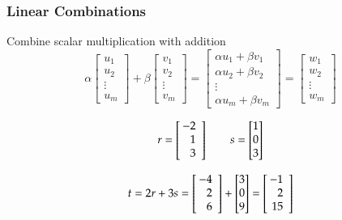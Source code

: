 \documentclass[10pt]{beamer}
\begin{document}
\begin{frame}
\frametitle{Linear Combinations}

Combine scalar multiplication with addition
\begin{equation*}
      \alpha \begin{bmatrix} u_1 \\ u_2 \\ \vdots \\ u_m\end{bmatrix}
    + \beta  \begin{bmatrix} v_1 \\ v_2 \\ \vdots \\ v_m\end{bmatrix}
    = \begin{bmatrix}\alpha u_1 + \beta v_1\\
                     \alpha u_2 + \beta v_2\\
                     \vdots \\
                     \alpha u_m + \beta v_m  \end{bmatrix}
    = \begin{bmatrix} w_1 \\ w_2 \\ \vdots \\ w_m \end{bmatrix}
\end{equation*}

\vspace{0.0cm}
\begin{equation*}
    r = \left[\negthickspace\begin{array}{r} -2 \\ 1 \\ 3 \end{array}\right]
    \qquad
    s = \begin{bmatrix} 1 \\ 0  \\ 3 \end{bmatrix}
\end{equation*}

\begin{equation*}
    t = 2r + 3s = \left[\negthickspace\begin{array}{r} -4 \\ 2 \\ 6 \end{array}\right]
                  + \begin{bmatrix} 3 \\ 0  \\ 9 \end{bmatrix}
                = \left[\negthickspace\begin{array}{r} -1 \\ 2 \\ 15 \end{array}\right]
\end{equation*}

\end{frame}
\end{document}
